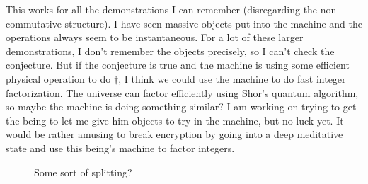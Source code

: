 \documentclass[12pt]{article}
\newcommand{\fancy}[1]{\mathcal{#1}}
\newcommand{\C}[1]{\fancy{C}_{#1}}
\def\C{\fancy{C}}
\newcommand{\Bond}[6]%
{ \begin{pgfonlayer}{background}
        \colorlet{InColor}{#4}
        \colorlet{OutColor}{#5}
        \foreach \I in {#6,...,1}
        {   \pgfmathsetlengthmacro{\r}{#3/#6*\I}
            \pgfmathsetmacro{\C}{sqrt(1-\r*\r/#3/#3)*100}
            \draw[InColor!\C!OutColor, line width=\r] (#1.center) -- (#2.center);
        }
    \end{pgfonlayer}
}
\newcommand{\BlackBond}[2]%
{   \Bond{#1}{#2}{0.7071mm}{black!25}{black!25!black}{10}
}
\begin{document}
This works for all the demonstrations I can remember (disregarding the non-commutative structure).   I have seen massive objects put into the machine and the operations always seem to be instantaneous.  For a lot of these
larger demonstrations, I don't remember the objects precisely, so I can't check the conjecture.  But if the conjecture is true and the machine is using some efficient physical operation to do $\dagger$, I think we could
use the machine to do fast integer factorization.  The universe can factor efficiently using Shor's quantum algorithm, so maybe the machine is doing something similar?   I am working on trying to get the being to let me give 
him objects to try in the machine, but no luck yet.  It would be rather amusing to break encryption by going into a deep meditative state and use this being's machine to factor integers.

\begin{figure}\label{ManyFromFew}
\centering
{}
\caption{Some sort of splitting?}
\end{figure}
\end{document}

